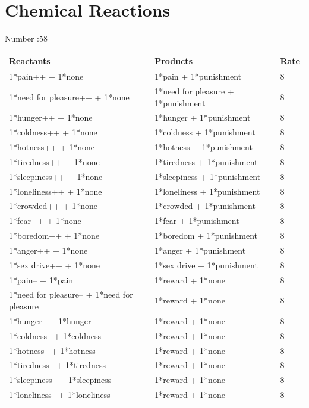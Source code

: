 \documentclass{article}
\begin{document}
\newpage

\section*{Chemical Reactions}

Number :58

\begin{longtable}{|p{7cm}|p{7cm}|p{2cm}|}
\hline
{\bf Reactants} & {\bf Products} & {\bf Rate} \\ \hline
1*pain++ + 1*none & 1*pain + 1*punishment & 8 \\ \hline
1*need for pleasure++ + 1*none & 1*need for pleasure + 1*punishment & 8 \\ \hline
1*hunger++ + 1*none & 1*hunger + 1*punishment & 8 \\ \hline
1*coldness++ + 1*none & 1*coldness + 1*punishment & 8 \\ \hline
1*hotness++ + 1*none & 1*hotness + 1*punishment & 8 \\ \hline
1*tiredness++ + 1*none & 1*tiredness + 1*punishment & 8 \\ \hline
1*sleepiness++ + 1*none & 1*sleepiness + 1*punishment & 8 \\ \hline
1*loneliness++ + 1*none & 1*loneliness + 1*punishment & 8 \\ \hline
1*crowded++ + 1*none & 1*crowded + 1*punishment & 8 \\ \hline
1*fear++ + 1*none & 1*fear + 1*punishment & 8 \\ \hline
1*boredom++ + 1*none & 1*boredom + 1*punishment & 8 \\ \hline
1*anger++ + 1*none & 1*anger + 1*punishment & 8 \\ \hline
1*sex drive++ + 1*none & 1*sex drive + 1*punishment & 8 \\ \hline
1*pain-- + 1*pain & 1*reward + 1*none & 8 \\ \hline
1*need for pleasure-- + 1*need for pleasure & 1*reward + 1*none & 8 \\ \hline
1*hunger-- + 1*hunger & 1*reward + 1*none & 8 \\ \hline
1*coldness-- + 1*coldness & 1*reward + 1*none & 8 \\ \hline
1*hotness-- + 1*hotness & 1*reward + 1*none & 8 \\ \hline
1*tiredness-- + 1*tiredness & 1*reward + 1*none & 8 \\ \hline
1*sleepiness-- + 1*sleepiness & 1*reward + 1*none & 8 \\ \hline
1*loneliness-- + 1*loneliness & 1*reward + 1*none & 8 \\ \hline

\end{longtable}
\end{document}
